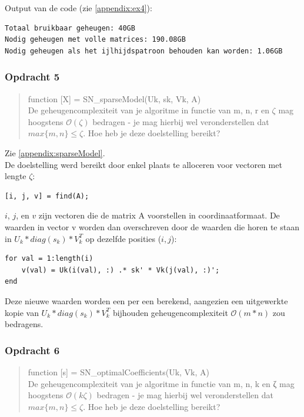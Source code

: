 \documentclass[11pt, a4paper, titlepage, openright]{article}
\begin{document}
	Output van de code (zie \ref{appendix:ex4}):
\begin{lstlisting}
Totaal bruikbaar geheugen: 40GB
Nodig geheugen met volle matrices: 190.08GB
Nodig geheugen als het ijlhijdspatroon behouden kan worden: 1.06GB
\end{lstlisting}

	\subsubsection{Opdracht 5}
    \begin{quote}
        function [X] = SN\_sparseModel(Uk, sk, Vk, A) \\
        De geheugencomplexiteit van je algoritme in functie van m, n, r en \(\zeta\) mag hoogstens \(\mathcal{O}(\zeta)\) bedragen
        - je mag hierbij wel veronderstellen dat \( max\{m, n\} \leq \zeta \). Hoe heb je deze doelstelling bereikt?
    \end{quote}

    Zie \ref{appendix:sparseModel}. \\
    De doelstelling werd bereikt door enkel plaats te alloceren voor vectoren met lengte \( \zeta \):
\begin{lstlisting}[style=Matlab-editor, basicstyle = \scriptsize]
[i, j, v] = find(A);
\end{lstlisting}
     \(i\), \(j\), en \(v\) zijn vectoren
    die de matrix A voorstellen in coordinaatformaat. De waarden in vector v worden dan overschreven door de waarden die horen te staan in
    \( U_k * diag(s_k) * V_k^T \) op dezelfde posities (\(i, j\)):
\begin{lstlisting}[style=Matlab-editor, basicstyle = \scriptsize]
for val = 1:length(i)
    v(val) = Uk(i(val), :) .* sk' * Vk(j(val), :)';
end
\end{lstlisting}
    Deze nieuwe waarden worden een per een berekend, aangezien een uitgewerkte kopie van
    \( U_k * diag(s_k) * V_k^T \) bijhouden geheugencomplexiteit \(\mathcal{O}(m*n)\) zou bedragens.

	\subsubsection{Opdracht 6}
    \begin{quote}
        function [s] = SN\_optimalCoefficients(Uk, Vk, A) \\
        De geheugencomplexiteit van je algoritme in functie van m, n, k en ζ mag hoogstens \(\mathcal{O}(k\zeta)\) bedragen
        - je mag hierbij wel veronderstellen dat \( max\{m, n\} \leq \zeta \). Hoe heb je deze doelstelling bereikt?
    \end{quote}
\end{document}
